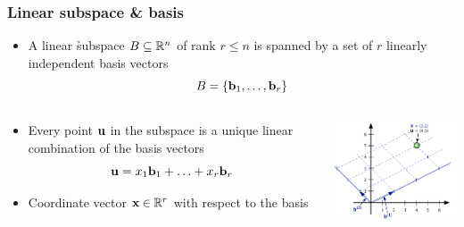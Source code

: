 \documentclass[t]{beamer} %
\begin{document}
\begin{frame}
  \frametitle{Linear subspace \& basis}
  
  \begin{itemize}
  \item A linear \h{subspace} $B\subseteq \mathbb{R}^n$ of rank $r\leq n$ is spanned by a set of $r$ linearly independent basis vectors
    \[
    B = \set{\vb_1, \ldots, \vb_r}
    \]
  \end{itemize}

  \begin{columns}[T]
    \begin{column}{55mm}
      \begin{itemize}
      \item<2-> Every point $\vu$ in the subspace is a unique linear combination of the basis vectors
        \[
          \vu = x_1 \vb_1 + \ldots + x_r \vb_r
        \]
      \item<2-> Coordinate vector $\vx\in \setR^r$ with respect to the basis
      \end{itemize}
    \end{column}
    \begin{column}{45mm}
      \hspace*{-5mm}%
      \includegraphics[width=55mm]{img/7_basis_grid}  
    \end{column}
  \end{columns}
\end{frame}
\end{document}

